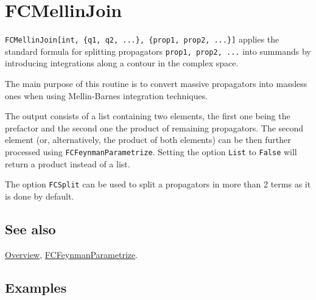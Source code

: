 \documentclass[../FeynCalcManual.tex]{subfiles}
\begin{document}
\hypertarget{fcmellinjoin}{
\section{FCMellinJoin}\label{fcmellinjoin}}

\texttt{FCMellinJoin[\allowbreak{}int,\ \allowbreak{}\{\allowbreak{}q1,\ \allowbreak{}q2,\ \allowbreak{}...\},\ \allowbreak{}\{\allowbreak{}prop1,\ \allowbreak{}prop2,\ \allowbreak{}...\}]}
applies the standard formula for splitting propagators
\texttt{prop1,\ \allowbreak{}prop2,\ \allowbreak{}...} into summands by
introducing integrations along a contour in the complex space.

The main purpose of this routine is to convert massive propagators into
massless ones when using Mellin-Barnes integration techniques.

The output consists of a list containing two elements, the first one
being the prefactor and the second one the product of remaining
propagators. The second element (or, alternatively, the product of both
elements) can be then further processed using
\texttt{FCFeynmanParametrize}. Setting the option \texttt{List} to
\texttt{False} will return a product instead of a list.

The option \texttt{FCSplit} can be used to split a propagators in more
than 2 terms as it is done by default.

\subsection{See also}

\hyperlink{toc}{Overview},
\hyperlink{fcfeynmanparametrize}{FCFeynmanParametrize}.

\subsection{Examples}

\begin{Shaded}
\begin{Highlighting}[]
\OperatorTok{[}\OperatorTok{[}\OperatorTok{,} \OperatorTok{\{}\SpecialCharTok{{-}}\SpecialCharTok{+} \OperatorTok{,} \OperatorTok{\},} \OperatorTok{\{}\SpecialCharTok{{-}}\SpecialCharTok{+} \OperatorTok{,} \OperatorTok{\},} \OperatorTok{\{}\SpecialCharTok{{-}}\SpecialCharTok{+} \OperatorTok{,} \OperatorTok{\}],} \OperatorTok{\{}\OperatorTok{\},} \OperatorTok{\{}\OperatorTok{[\{} \SpecialCharTok{{-}}\OperatorTok{,} \SpecialCharTok{\^{}}\OperatorTok{\}],} 
\OperatorTok{[\{} \SpecialCharTok{{-}}\OperatorTok{,} \SpecialCharTok{\^{}}\OperatorTok{\}]\},}  \OtherTok{{-}\textgreater{}} \OperatorTok{]}
\end{Highlighting}
\end{Shaded}
\end{document}
